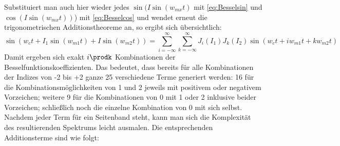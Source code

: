 Substituiert man auch hier wieder jedes \begin{math} \sin(I\sin(w_{mx}t) \end{math} mit \ref{eq:Besselsin} und \begin{math} \cos(I\sin(w_{mx}t)) \end{math}) mit \ref{eq:Besselcos} und wendet erneut die trigonometrischen Additionstheoreme an, so ergibt sich übersichtlich:
\begin{equation}\label{eq:ParallelKompakt}
\sin(w_ct + I_1\sin(w_{m1}t) + I\sin(w_{m2}t)) = \sum_{i=-\infty}^{\infty}\sum_{k=-\infty}^{\infty}J_i(I_1)J_k(I_2)\sin(w_ct + iw_{m1}t + kw_{m2}t)
\end{equation}
Damit ergeben sich exakt $i\prodk$ Kombinationen der Besselfunktionskoeffizienten. Das bedeutet, dass bereits für alle Kombinationen der Indizes von -2 bis +2 ganze 25 verschiedene Terme generiert werden: 16 für die Kombinationsmöglichkeiten von 1 und 2 jeweils mit positivem oder negativem Vorzeichen; weitere 9 für die Kombinationen von 0 mit 1 oder 2 inklusive beider Vorzeichen; schließlich noch die einzelne Kombination von 0 mit sich selbst. Nachdem jeder Term für ein Seitenband steht, kann man sich die Komplexität des resultierenden Spektrums leicht ausmalen. Die entsprechenden Additionsterme sind wie folgt:
